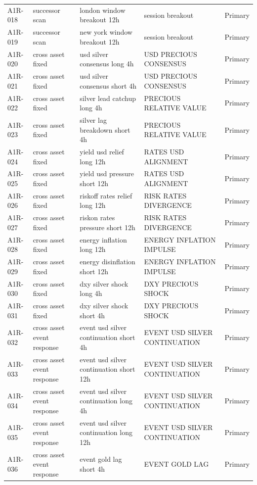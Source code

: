 \begin{longtable}{P{1.1cm}P{1.9cm}P{3.7cm}P{3.1cm}P{1.5cm}}
A1R-018 & successor scan & london window breakout 12h & session breakout & Primary \\
A1R-019 & successor scan & new york window breakout 12h & session breakout & Primary \\
A1R-020 & cross asset fixed & usd silver consensus long 4h & USD PRECIOUS CONSENSUS & Primary \\
A1R-021 & cross asset fixed & usd silver consensus short 4h & USD PRECIOUS CONSENSUS & Primary \\
A1R-022 & cross asset fixed & silver lead catchup long 4h & PRECIOUS RELATIVE VALUE & Primary \\
A1R-023 & cross asset fixed & silver lag breakdown short 4h & PRECIOUS RELATIVE VALUE & Primary \\
A1R-024 & cross asset fixed & yield usd relief long 12h & RATES USD ALIGNMENT & Primary \\
A1R-025 & cross asset fixed & yield usd pressure short 12h & RATES USD ALIGNMENT & Primary \\
A1R-026 & cross asset fixed & riskoff rates relief long 12h & RISK RATES DIVERGENCE & Primary \\
A1R-027 & cross asset fixed & riskon rates pressure short 12h & RISK RATES DIVERGENCE & Primary \\
A1R-028 & cross asset fixed & energy inflation long 12h & ENERGY INFLATION IMPULSE & Primary \\
A1R-029 & cross asset fixed & energy disinflation short 12h & ENERGY INFLATION IMPULSE & Primary \\
A1R-030 & cross asset fixed & dxy silver shock long 4h & DXY PRECIOUS SHOCK & Primary \\
A1R-031 & cross asset fixed & dxy silver shock short 4h & DXY PRECIOUS SHOCK & Primary \\
A1R-032 & cross asset event response & event usd silver continuation short 4h & EVENT USD SILVER CONTINUATION & Primary \\
A1R-033 & cross asset event response & event usd silver continuation short 12h & EVENT USD SILVER CONTINUATION & Primary \\
A1R-034 & cross asset event response & event usd silver continuation long 4h & EVENT USD SILVER CONTINUATION & Primary \\
A1R-035 & cross asset event response & event usd silver continuation long 12h & EVENT USD SILVER CONTINUATION & Primary \\
A1R-036 & cross asset event response & event gold lag short 4h & EVENT GOLD LAG & Primary \\

\end{longtable}
